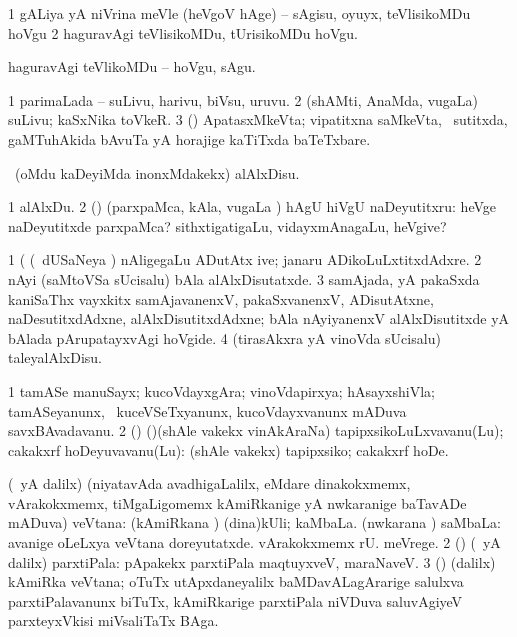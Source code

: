 \bentry
{} 
\gl{\sakirx}
\expl{}
\bmng
\bnum
\num{1} gALiya yA niVrina meVle (heVgoV hAge) -- sAgisu, oyuyx, teVlisikoMDu hoVgu 
\num{2} haguravAgi teVlisikoMDu, tUrisikoMDu hoVgu. 
\enum
\emng

\noindent 
\gl{\akirx}
\expl{}
\bmng
haguravAgi teVlikoMDu -- hoVgu, sAgu. 
\emng
\eentry

\bentry
{} 
\gl{\nA}
\expl{}
\bmng
\bnum
\num{1} parimaLada -- suLivu, harivu, biVsu, uruvu. 
\num{2} (shAMti, AnaMda, \mo vugaLa) suLivu; kaSxNika toVkeR. 
\hypertarget{waft(2)3}{} 
\num{3} (\nw) ApatasxMkeVta; vipatitxna saMkeVta, \udA\ sutitxda, gaMTuhAkida bAvuTa yA horajige kaTiTxda baTeTxbare. 
\enum
\emng
\eentry

\bentry
{} 
\gl{\kirx}
\bmng
 \sakirx\ (oMdu kaDeyiMda inonxMdakekx) alAlxDisu. 
\emng

\noindent 
\gl{\akirx}
\expl{}
\bmng
\bnum
\num{1} alAlxDu. 
\num{2} (\pArxparx) (parxpaMca, kAla, \mo vugaLa \vi) hAgU hiVgU naDeyutitxru:  heVge naDeyutitxde parxpaMca? sithxtigatigaLu, vidayxmAnagaLu, heVgive? 
\enum
\emng

\noindent 
\gl{\pagu}
\expl{}
\bmng
\bnum
\num{1}  (      (\kanmu\ dUSaNeya \vi) nAligegaLu ADutAtx ive; janaru ADikoLuLxtitxdAdxre. 
\num{2}  nAyi (saMtoVSa sUcisalu) bAla alAlxDisutatxde. 
\num{3}  samAjada, yA pakaSxda kaniSaThx vayxkitx samAjavanenxV, pakaSxvanenxV, ADisutAtxne, naDesutitxdAdxne, alAlxDisutitxdAdxne; bAla nAyiyanenxV alAlxDisutitxde yA bAlada pArupatayxvAgi hoVgide. 
\num{4}  (tirasAkxra yA vinoVda sUcisalu) taleyalAlxDisu. 
\enum
\emng
\eentry

 
\bentry
{}
\gl{\nA}
\expl{}
\bmng
\bnum
\num{1} tamASe manuSayx; kucoVdayxgAra; vinoVdapirxya; hAsayxshiVla; tamASeyanunx, \kanmu\ kuceVSeTxyanunx, kucoVdayxvanunx mADuva savxBAvadavanu. 
\num{2} (\ashi) (\birx)(shAle \mo vakekx vinAkAraNa) tapipxsikoLuLxvavanu(Lu); cakakxrf hoDeyuvavanu(Lu):  (shAle \mo vakekx) tapipxsiko; cakakxrf hoDe. 
\enum
\emng
\eentry

\bentry
{} 
\gl{\nA}
\expl{}
\bmng
\bnum
{} (\Eva\ yA \bava dalilx) (niyatavAda avadhigaLalilx, eMdare dinakokxmemx, vArakokxmemx, tiMgaLigomemx kAmiRkanige yA nwkaranige baTavADe mADuva) veVtana: 
\banum
{} (kAmiRkana \vi) (dina)kUli; kaMbaLa. 
 (nwkarana \vi) saMbaLa:  avanige oLeLxya veVtana doreyutatxde.  vArakokxmemx  rU. meVrege. 
\eanum
\numie
\num{2} (\rUpa) (\Eva\ yA \bava dalilx) parxtiPala:  pApakekx parxtiPala maqtuyxveV, maraNaveV. 
\num{3} (\athaRshA) (\bava dalilx) kAmiRka veVtana; oTuTx utApxdaneyalilx baMDavALagArarige salulxva parxtiPalavanunx biTuTx, kAmiRkarige parxtiPala niVDuva saluvAgiyeV parxteyxVkisi miVsaliTaTx BAga. 
\enum
\emng

